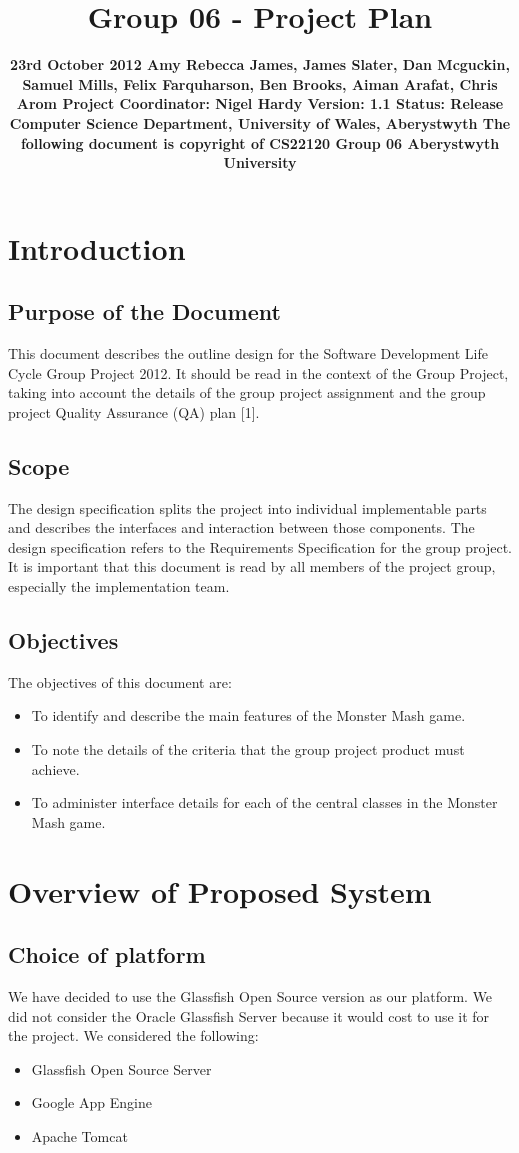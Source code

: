 \documentclass[titlepage]{article}
\title{\textbf{Group 06 - Project Plan}}
\date{\textbf{23rd October 2012 \linebreak Amy Rebecca James, James Slater, Dan Mcguckin, Samuel Mills, Felix Farquharson, \linebreak Ben Brooks, Aiman Arafat, Chris Arom \linebreak Project Coordinator: Nigel Hardy \linebreak Version: 1.1 \linebreak Status: Release \linebreak Computer Science Department, University of Wales, Aberystwyth \linebreak The following document is copyright of CS22120 Group 06 Aberystwyth University}}
\begin{document}
\maketitle
\tableofcontents
\newpage
\section{Introduction}
\subsection{Purpose of the Document}
This document describes the outline design for the Software Development Life Cycle Group Project 2012. It should be read in the context of the Group Project, taking into account the details of the group project assignment and the group project Quality Assurance (QA) plan [1].
\subsection{Scope}
The design specification splits the project into individual implementable parts and describes the interfaces and interaction between those components. The design specification refers to the Requirements Specification for the group project. It is important that this document is read by all members of the project group, especially the implementation team.
\subsection{Objectives}
The objectives of this document are:
\begin{itemize}
\item{To identify and describe the main features of the Monster Mash game.}
\item{To note the details of the criteria that the group project product must achieve.}
\item{ To administer interface details for each of the central classes in the Monster
Mash game.}
\end{itemize}
\newpage
\section{Overview of Proposed System}
\subsection{Choice of platform}
We have decided to use the Glassfish Open Source version as our platform. We did not consider the Oracle Glassfish Server because it would cost to use it for the project.
We considered the following:
\begin{itemize}
\item{Glassfish Open Source Server}
\item{Google App Engine}
\item{Apache Tomcat}
\end{itemize}
\end{document}
